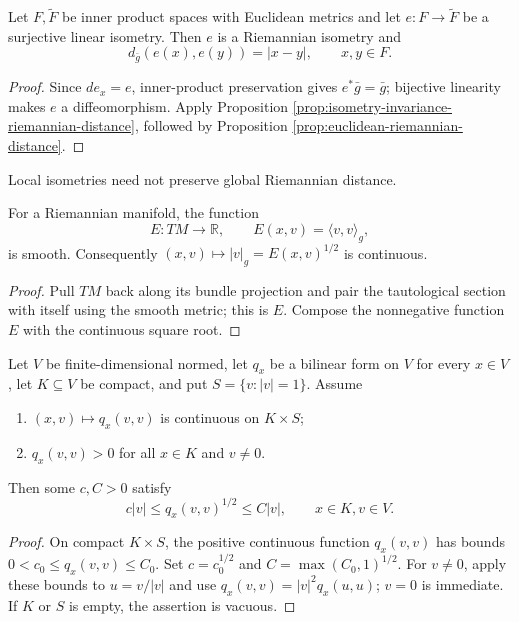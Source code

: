 \begin{proposition}
\label{prop:euclidean-linear-isometry-distance}
\leanok
{}
Let $F,\widetilde F$ be inner product spaces with Euclidean metrics and let $e:F\to\widetilde F$ be a surjective linear isometry. Then $e$ is a Riemannian isometry and
\[
d_{\bar g}(e(x),e(y))=|x-y|,
\qquad x,y\in F.
\]
\end{proposition}
\begin{proof}
\leanok
{}
\sketch Since $de_x=e$, inner-product preservation gives $e^*\bar g=\bar g$; bijective linearity makes $e$ a diffeomorphism. Apply Proposition \ref{prop:isometry-invariance-riemannian-distance}, followed by Proposition \ref{prop:euclidean-riemannian-distance}.
\end{proof}

Local isometries need not preserve global Riemannian distance.

\begin{lemma}
\label{lem:metric-energy-smooth}
\leanok
{}
For a Riemannian manifold, the function
\[
E:TM\to\mathbb R,\qquad E(x,v)=\langle v,v\rangle_g,
\]
is smooth. Consequently $(x,v)\mapsto|v|_g=E(x,v)^{1/2}$ is continuous.
\end{lemma}
\begin{proof}
\leanok
{}
\sketch Pull $TM$ back along its bundle projection and pair the tautological section with itself using the smooth metric; this is $E$. Compose the nonnegative function $E$ with the continuous square root.
\end{proof}

\begin{lemma}
\label{lem:norm-comparison-compact-core}
\leanok
Let $V$ be finite-dimensional normed, let $q_x$ be a bilinear form on $V$ for every $x\in V$, let $K\subseteq V$ be compact, and put $S=\{v:|v|=1\}$. Assume
\begin{enumerate}
\item[(i)] $(x,v)\mapsto q_x(v,v)$ is continuous on $K\times S$;
\item[(ii)] $q_x(v,v)>0$ for all $x\in K$ and $v\ne0$.
\end{enumerate}
Then some $c,C>0$ satisfy
\[
c|v|\le q_x(v,v)^{1/2}\le C|v|,
\qquad x\in K, v\in V.
\]
\end{lemma}
\begin{proof}
\leanok
\sketch On compact $K\times S$, the positive continuous function $q_x(v,v)$ has bounds $0<c_0\le q_x(v,v)\le C_0$. Set $c=c_0^{1/2}$ and $C=\max(C_0,1)^{1/2}$. For $v\ne0$, apply these bounds to $u=v/|v|$ and use $q_x(v,v)=|v|^2q_x(u,u)$; $v=0$ is immediate. If $K$ or $S$ is empty, the assertion is vacuous.
\end{proof}


